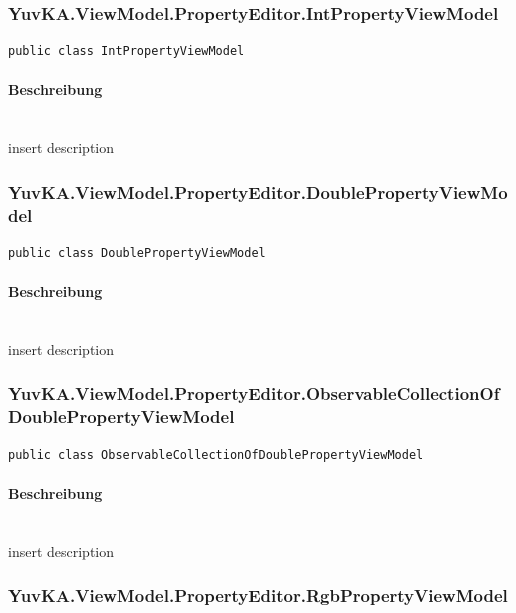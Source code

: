 \subsubsection{YuvKA.ViewModel.PropertyEditor.IntPropertyViewModel}

\begin{verbatim}
public class IntPropertyViewModel
\end{verbatim}

\paragraph{Beschreibung}~\\
insert description




\subsubsection{YuvKA.ViewModel.PropertyEditor.DoublePropertyViewModel}

\begin{verbatim}
public class DoublePropertyViewModel
\end{verbatim}

\paragraph{Beschreibung}~\\
insert description




\subsubsection{YuvKA.ViewModel.PropertyEditor.ObservableCollectionOfDoublePropertyViewModel}

\begin{verbatim}
public class ObservableCollectionOfDoublePropertyViewModel
\end{verbatim}

\paragraph{Beschreibung}~\\
insert description



\subsubsection{YuvKA.ViewModel.PropertyEditor.RgbPropertyViewModel}

